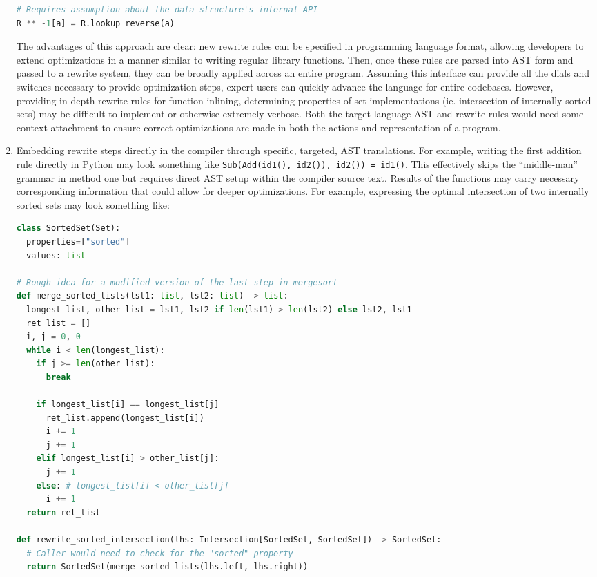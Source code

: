 \documentclass{article}
\begin{document}
\begin{enumerate}
\begin{lstlisting}[language=python]
# Requires assumption about the data structure's internal API
R ** -1[a] = R.lookup_reverse(a)
\end{lstlisting}
  The advantages of this approach are clear: new rewrite rules can be specified in programming language format, allowing developers to extend optimizations in a manner similar to writing regular library functions. Then, once these rules are parsed into AST form and passed to a rewrite system, they can be broadly applied across an entire program. Assuming this interface can provide all the dials and switches necessary to provide optimization steps, expert users can quickly advance the language for entire codebases. However, providing in depth rewrite rules for function inlining, determining properties of set implementations (ie. intersection of internally sorted sets) may be difficult to implement or otherwise extremely verbose. Both the target language AST and rewrite rules would need some context attachment to ensure correct optimizations are made in both the actions and representation of a program.
  \item Embedding rewrite steps directly in the compiler through specific, targeted, AST translations. For example, writing the first addition rule directly in Python may look something like \texttt{Sub(Add(id1(), id2()), id2()) = id1()}. This effectively skips the ``middle-man'' grammar in method one but requires direct AST setup within the compiler source text. Results of the functions may carry necessary corresponding information that could allow for deeper optimizations. For example, expressing the optimal intersection of two internally sorted sets may look something like:
  \begin{lstlisting}[language=python]
class SortedSet(Set):
  properties=["sorted"]
  values: list

# Rough idea for a modified version of the last step in mergesort
def merge_sorted_lists(lst1: list, lst2: list) -> list:
  longest_list, other_list = lst1, lst2 if len(lst1) > len(lst2) else lst2, lst1
  ret_list = []
  i, j = 0, 0
  while i < len(longest_list):
    if j >= len(other_list):
      break

    if longest_list[i] == longest_list[j]
      ret_list.append(longest_list[i])
      i += 1
      j += 1
    elif longest_list[i] > other_list[j]:
      j += 1
    else: # longest_list[i] < other_list[j]
      i += 1
  return ret_list

def rewrite_sorted_intersection(lhs: Intersection[SortedSet, SortedSet]) -> SortedSet:
  # Caller would need to check for the "sorted" property
  return SortedSet(merge_sorted_lists(lhs.left, lhs.right))
\end{lstlisting}
\end{enumerate}
\end{document}
